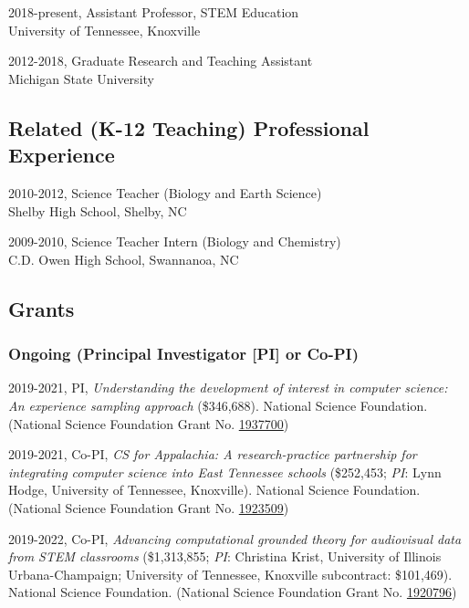 \documentclass[14,]{article}
\begin{document}
2018-present, Assistant Professor, STEM Education\\
University of Tennessee, Knoxville

2012-2018, Graduate Research and Teaching Assistant\\
Michigan State University

\hypertarget{related-k-12-teaching-professional-experience}{%
\subsection{Related (K-12 Teaching) Professional
Experience}\label{related-k-12-teaching-professional-experience}}

2010-2012, Science Teacher (Biology and Earth Science)\\
Shelby High School, Shelby, NC

2009-2010, Science Teacher Intern (Biology and Chemistry)\\
C.D. Owen High School, Swannanoa, NC

\hypertarget{grants}{%
\subsection{Grants}\label{grants}}

\hypertarget{ongoing-principal-investigator-pi-or-co-pi}{%
\subsubsection{Ongoing (Principal Investigator {[}PI{]} or
Co-PI)}\label{ongoing-principal-investigator-pi-or-co-pi}}

2019-2021, PI, \emph{Understanding the development of interest in
computer science: An experience sampling approach} (\$346,688). National
Science Foundation. (National Science Foundation Grant No.
\href{https://www.nsf.gov/awardsearch/showAward?AWD_ID=1937700\&HistoricalAwards=false}{1937700})

2019-2021, Co-PI, \emph{CS for Appalachia: A research-practice
partnership for integrating computer science into East Tennessee
schools} (\$252,453; \emph{PI}: Lynn Hodge, University of Tennessee,
Knoxville). National Science Foundation. (National Science Foundation
Grant No.
\href{https://www.nsf.gov/awardsearch/showAward?AWD_ID=1923509\&HistoricalAwards=false}{1923509})

2019-2022, Co-PI, \emph{Advancing computational grounded theory for
audiovisual data from STEM classrooms} (\$1,313,855; \emph{PI}:
Christina Krist, University of Illinois Urbana-Champaign; University of
Tennessee, Knoxville subcontract: \$101,469). National Science
Foundation. (National Science Foundation Grant No.
\href{https://www.nsf.gov/awardsearch/showAward?AWD_ID=1920796\&HistoricalAwards=false}{1920796})
\end{document}

